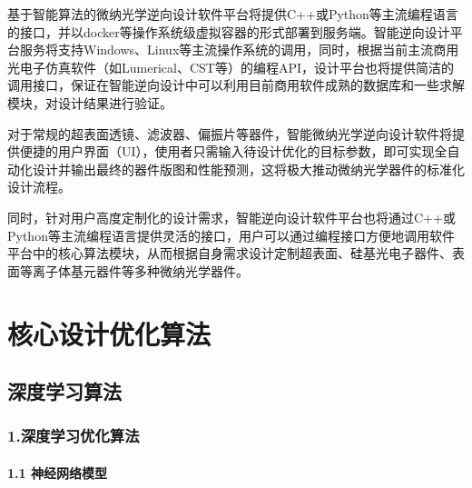 \documentclass[letterpaper,10pt,english]{sphinxmanual}
\begin{document}
\sphinxAtStartPar
基于智能算法的微纳光学逆向设计软件平台将提供C++或Python等主流编程语言的接口，并以docker等操作系统级虚拟容器的形式部署到服务端。智能逆向设计平台服务将支持Windows、Linux等主流操作系统的调用，同时，根据当前主流商用光电子仿真软件（如Lumerical、CST等）的编程API，设计平台也将提供简洁的调用接口，保证在智能逆向设计中可以利用目前商用软件成熟的数据库和一些求解模块，对设计结果进行验证。

\sphinxAtStartPar
对于常规的超表面透镜、滤波器、偏振片等器件，智能微纳光学逆向设计软件将提供便捷的用户界面（UI），使用者只需输入待设计优化的目标参数，即可实现全自动化设计并输出最终的器件版图和性能预测，这将极大推动微纳光学器件的标准化设计流程。

\sphinxAtStartPar
同时，针对用户高度定制化的设计需求，智能逆向设计软件平台也将通过C++或Python等主流编程语言提供灵活的接口，用户可以通过编程接口方便地调用软件平台中的核心算法模块，从而根据自身需求设计定制超表面、硅基光电子器件、表面等离子体基元器件等多种微纳光学器件。

\sphinxstepscope


\section{核心设计优化算法}
\label{\detokenize{_u7b80_u4ecb/_u6838_u5fc3_u8bbe_u8ba1_u4f18_u5316_u7b97_u6cd5/index:id1}}\label{\detokenize{_u7b80_u4ecb/_u6838_u5fc3_u8bbe_u8ba1_u4f18_u5316_u7b97_u6cd5/index::doc}}
\sphinxstepscope


\subsection{深度学习算法}
\label{\detokenize{_u7b80_u4ecb/_u6838_u5fc3_u8bbe_u8ba1_u4f18_u5316_u7b97_u6cd5/_u6df1_u5ea6_u5b66_u4e60_u6a21_u5757/_u6df1_u5ea6_u5b66_u4e60_u6a21_u578b:id1}}\label{\detokenize{_u7b80_u4ecb/_u6838_u5fc3_u8bbe_u8ba1_u4f18_u5316_u7b97_u6cd5/_u6df1_u5ea6_u5b66_u4e60_u6a21_u5757/_u6df1_u5ea6_u5b66_u4e60_u6a21_u578b::doc}}

\subsubsection{1.深度学习优化算法}
\label{\detokenize{_u7b80_u4ecb/_u6838_u5fc3_u8bbe_u8ba1_u4f18_u5316_u7b97_u6cd5/_u6df1_u5ea6_u5b66_u4e60_u6a21_u5757/_u6df1_u5ea6_u5b66_u4e60_u6a21_u578b:id2}}

\paragraph{1.1 神经网络模型}
\label{\detokenize{_u7b80_u4ecb/_u6838_u5fc3_u8bbe_u8ba1_u4f18_u5316_u7b97_u6cd5/_u6df1_u5ea6_u5b66_u4e60_u6a21_u5757/_u6df1_u5ea6_u5b66_u4e60_u6a21_u578b:id3}}
\end{document}
